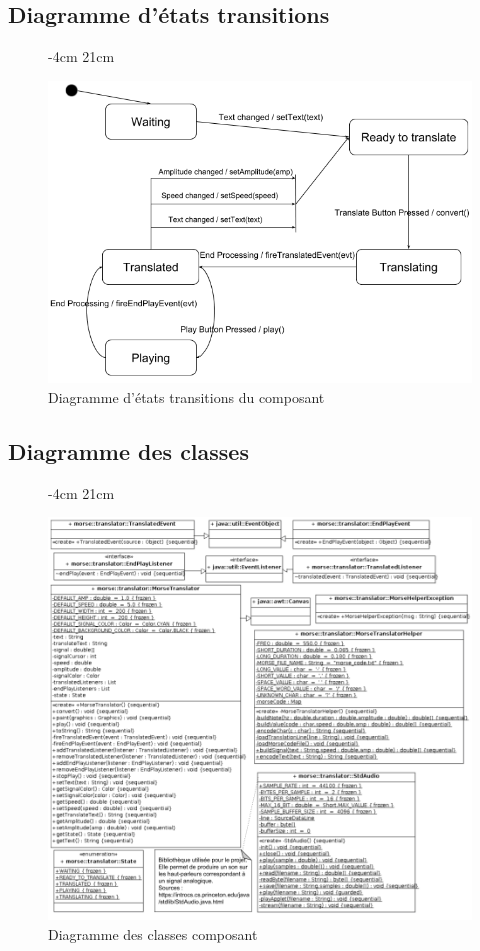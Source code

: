 \documentclass[a4paper,11pt]{article}
\begin{document}
    \subsection{Diagramme d'états transitions}
    \begin{figure}[H]
         -4cm 21cm
        \begin{center}
            \includegraphics[scale=0.8]{etatsdiag.png}
            \caption{Diagramme d'états transitions du composant}
            \label{Diagramme d'états transitions du composant}
        \end{center}
    \end{figure}
    \subsection{Diagramme des classes}
    \begin{figure}[H]
         -4cm 21cm
        \begin{center}
            \includegraphics[scale=0.58]{classdiag.png}
            \caption{Diagramme des classes composant}
            \label{Diagramme des classes du composant}
        \end{center}
    \end{figure}
\end{document}
